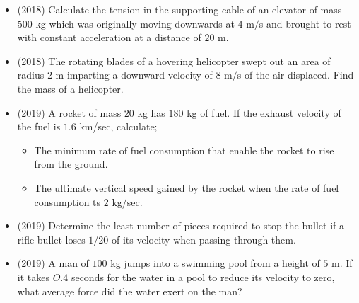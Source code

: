 \documentclass{article}
\begin{document}
\begin{itemize}
\item (2018)  Calculate the tension in the supporting cable of an elevator of mass $ 500$ kg which was originally moving downwards at $ 4$ m$/$s and brought to rest with constant acceleration at a distance of $ 20$ m. 
\item (2018)  The rotating blades of a hovering helicopter swept out an area of radius $ 2$ m imparting a downward velocity of $ 8$ m$/$s of the air displaced. Find the mass of a helicopter. 
\item (2019)  A rocket of mass $ 20$ kg has $ 180$ kg of fuel. If the exhaust velocity of the fuel is $ 1.6$ km/sec, calculate;\begin{itemize}
\item The minimum rate of fuel consumption that enable the rocket to rise from the ground. 
\item The ultimate vertical speed gained by the rocket when the rate of fuel consumption ts $ 2$ kg/sec. 
\end{itemize}
\item (2019)  Determine the least number of pieces required to stop the bullet if a rifle bullet loses $ 1/20$ of its velocity when passing through them.
\item (2019)  A man of $ 100$ kg jumps into a swimming pool from a height of $ 5$ m. If it takes $ O.4$ seconds for the water in a pool to reduce its velocity to zero, what average force did  the water exert on the man? 
\end{itemize}
\end{document}
